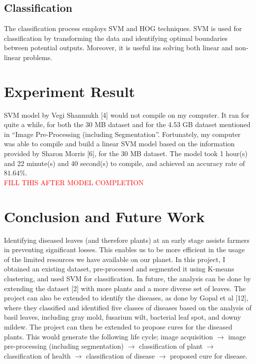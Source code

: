 \documentclass[twocolumn,10pt]{article}
\begin{document}
\begin{multicols}{2}
\begin{flushleft}
	
	\subsection{Classification}
	The classification process employs SVM and HOG techniques. SVM is used for classification by transforming the data and identifying optimal boundaries between potential outputs. Moreover, it is useful ins solving both linear and non-linear problems.\\
	
	\section{Experiment Result}
	SVM model by Vegi Shanmukh [4] would not compile on my computer. It ran for quite a while, for both the 30 MB dataset and for the 4.53 GB dataset mentioned in \enquote{Image Pre-Processing (including Segmentation}. Fortunately, my computer was able to compile and build a linear SVM model based on the information provided by Sharon Morris [6], for the 30 MB dataset. The model took 1 hour(s) and 22 minute(s) and 40 second(s) to compile, and achieved an accuracy rate of $81.64\%$.\\
	\textcolor{red}{FILL THIS AFTER MODEL COMPLETION}
	
	\section{Conclusion and Future Work}
	Identifying diseased leaves (and therefore plants) at an early stage assists farmers in preventing significant losses. This enables us to be more efficient in the usage of the limited resources we have available on our planet. In this project, I obtained an existing dataset, pre-processed and segmented it using K-means clustering, and used SVM for classification. In future, the analysis can be done by extending the dataset [2] with more plants and a more diverse set of leaves. The project can also be extended to identify the diseases, as done by Gopal et al [12], where they classified and identified five classes of diseases based on the analysis of basil leaves, including gray mold, fusarium wilt, bacterial leaf spot, and downy mildew. The project can then be extended to propose cures for the diseased plants. This would generate the following life cycle; image acquisition $\rightarrow$ image pre-processing (including segmentation) $\rightarrow$ classification of plant $\rightarrow$ classification of health $\rightarrow$ classification of disease $\rightarrow$ proposed cure for disease.
\end{flushleft}



\end{multicols}
\end{document}
